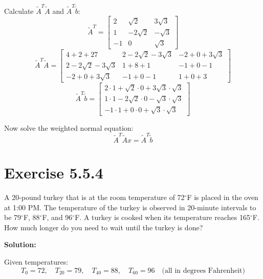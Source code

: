 \documentclass[12pt]{article}
\begin{document}
Calculate \( \tilde{A}^T \tilde{A} \) and \( \tilde{A}^T \tilde{b} \):
\[
  \tilde{A}^T = \begin{bmatrix} 2 & \sqrt{2} & 3\sqrt{3} \\ 1 & -2\sqrt{2} & -\sqrt{3} \\ -1 & 0 & \sqrt{3} \end{bmatrix}
\]
\[
  \tilde{A}^T \tilde{A} = \begin{bmatrix} 4 + 2 + 27 & 2 - 2\sqrt{2} - 3\sqrt{3} & -2 + 0 + 3\sqrt{3} \\ 2 - 2\sqrt{2} - 3\sqrt{3} & 1 + 8 + 1 & -1 + 0 - 1 \\ -2 + 0 + 3\sqrt{3} & -1 + 0 - 1 & 1 + 0 + 3 \end{bmatrix}
\]
\[
  \tilde{A}^T \tilde{b} = \begin{bmatrix} 2\cdot1 + \sqrt{2}\cdot0 + 3\sqrt{3}\cdot\sqrt{3} \\ 1\cdot1 - 2\sqrt{2}\cdot0 - \sqrt{3}\cdot\sqrt{3} \\ -1\cdot1 + 0\cdot0 + \sqrt{3}\cdot\sqrt{3} \end{bmatrix}
\]

Now solve the weighted normal equation:
\[
  \tilde{A}^T \tilde{A} x = \tilde{A}^T \tilde{b}
\]

\pagebreak

\section*{Exercise 5.5.4}
A 20-pound turkey that is at the room temperature of 72\(^{\circ}\)F is placed in the oven at 1:00 PM. The temperature of the turkey is observed in 20-minute intervals to be 79\(^{\circ}\)F, 88\(^{\circ}\)F, and 96\(^{\circ}\)F. A turkey is cooked when its temperature reaches 165\(^{\circ}\)F. How much longer do you need to wait until the turkey is done?


\textbf{Solution:}

Given temperatures:
\[
  T_0 = 72, \quad T_{20} = 79, \quad T_{40} = 88, \quad T_{60} = 96 \quad \text{(all in degrees Fahrenheit)}
\]
\end{document}
